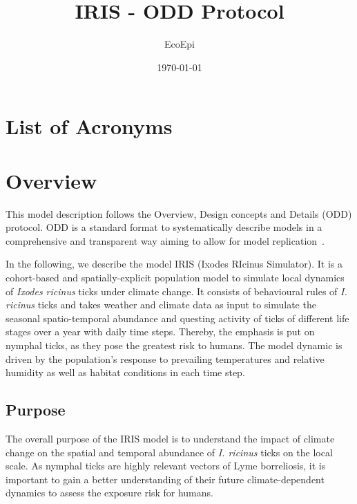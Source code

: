 \documentclass[a4paper, 11pt]{scrartcl}
\title{IRIS - ODD Protocol}
\author{EcoEpi}
\date{\today}
\begin{document}
\maketitle
\tableofcontents

\newpage
\listoffigures
\listoftables

\section*{List of Acronyms}
\begin{acronym}
\end{acronym}


\newpage
\section{Overview}
This model description follows the Overview, Design concepts and Details (ODD) protocol. ODD is a standard format to systematically describe models in a comprehensive and transparent way aiming to allow for model replication~\parencite{Grimm.2010, Grimm.2020}.

In the following, we describe the model IRIS (Ixodes RIcinus Simulator). It is a cohort-based and spatially-explicit population model to simulate local dynamics of \textit{Ixodes ricinus} ticks under climate change. It consists of behavioural rules of \textit{I. ricinus} ticks and takes weather and climate data as input to simulate the seasonal spatio-temporal abundance and questing activity of ticks of different life stages over a year with daily time steps. Thereby, the emphasis is put on nymphal ticks, as they pose the greatest risk to humans. The model dynamic is driven by the population's response to prevailing temperatures and relative humidity as well as habitat conditions in each time step.


\subsection{Purpose}
The overall purpose of the IRIS model is to understand the impact of climate change on the spatial and temporal abundance of \textit{I. ricinus} ticks on the local scale. As nymphal ticks are highly relevant vectors of Lyme borreliosis, it is important to gain a better understanding of their future climate-dependent dynamics to assess the exposure risk for humans. 
\end{document}

